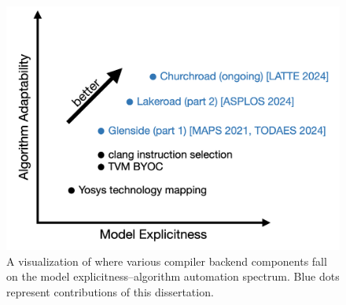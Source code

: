 \begin{figure}
    \centering
    \includegraphics[width=.7\textwidth]{intro-figures/model-alg-spectrum-keynote.png}
    \caption{
A visualization of where various compiler backend
  components
  fall
  on the model explicitness--algorithm automation
  spectrum.
Blue dots represent contributions of this
  dissertation.
    }
    \label{fig:intro:model-alg-spectrum}
\end{figure}
